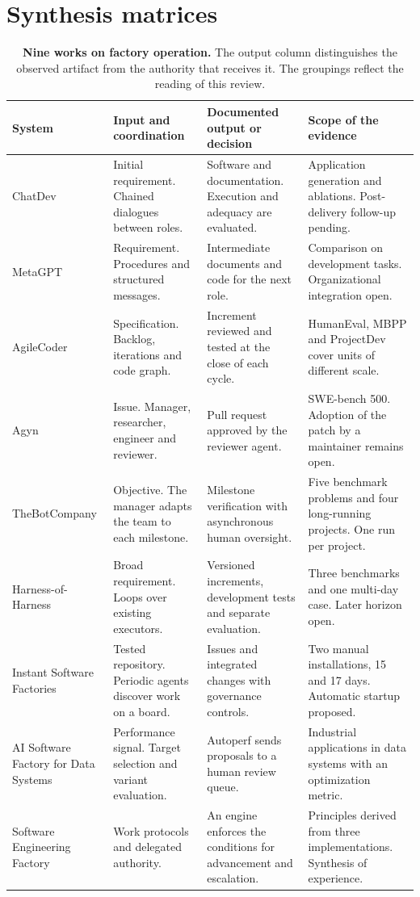 \documentclass[11pt,a4paper]{article}
\newcommand{\hd}[1]{\textcolor{ink}{\bfseries #1}}
\begin{document}
\section{Synthesis matrices}\label{sec:matrices}
\begin{table}[!ht]
\caption{\textbf{Nine works on factory operation.} The output column distinguishes the observed artifact from the authority that receives it. The groupings reflect the reading of this review.}\label{tab:estudios}
\small\setlength{\tabcolsep}{4pt}\renewcommand{\arraystretch}{1.23}
\begin{tabularx}{\linewidth}{@{}L{2.7cm}YYY@{}}
\toprule
\hd{System} & \hd{Input and coordination} & \hd{Documented output or decision} & \hd{Scope of the evidence} \\\midrule
ChatDev \citep{chatdev} & Initial requirement. Chained dialogues between roles. & Software and documentation. Execution and adequacy are evaluated. & Application generation and ablations. Post-delivery follow-up pending.\\
MetaGPT \citep{metagpt} & Requirement. Procedures and structured messages. & Intermediate documents and code for the next role. & Comparison on development tasks. Organizational integration open.\\
AgileCoder \citep{agile} & Specification. Backlog, iterations and code graph. & Increment reviewed and tested at the close of each cycle. & HumanEval, MBPP and ProjectDev cover units of different scale.\\
Agyn \citep{agyn} & Issue. Manager, researcher, engineer and reviewer. & Pull request approved by the reviewer agent. & SWE-bench 500. Adoption of the patch by a maintainer remains open.\\
TheBotCompany \citep{bot} & Objective. The manager adapts the team to each milestone. & Milestone verification with asynchronous human oversight. & Five benchmark problems and four long-running projects. One run per project.\\
Harness-of-Harness \citep{hoh} & Broad requirement. Loops over existing executors. & Versioned increments, development tests and separate evaluation. & Three benchmarks and one multi-day case. Later horizon open.\\
Instant Software Factories \citep{instant} & Tested repository. Periodic agents discover work on a board. & Issues and integrated changes with governance controls. & Two manual installations, 15 and 17 days. Automatic startup proposed.\\
AI Software Factory for Data Systems \citep{data} & Performance signal. Target selection and variant evaluation. & Autoperf sends proposals to a human review queue. & Industrial applications in data systems with an optimization metric.\\
Software Engineering Factory \citep{hassan} & Work protocols and delegated authority. & An engine enforces the conditions for advancement and escalation. & Principles derived from three implementations. Synthesis of experience.\\
\bottomrule
\end{tabularx}
\end{table}
\end{document}
